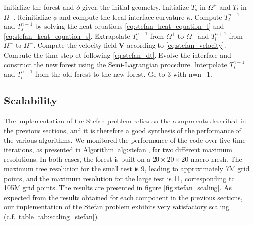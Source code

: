 \begin{algorithm}[htbp]
\caption{$\texttt{General procedure for solving the Stefan problem}$}
\begin{algorithmic}[1]
\State Initialize the forest and $\phi$ given the initial geometry.
\State Initialize $T_s$ in $\Omega^+$ and $T_l$ in $\Omega^-$.
\State Reinitialize $\phi$ and compute the local interface curvature $\kappa$.
\State Compute $T^{n+1}_l$ and $T^{n+1}_s$ by solving the heat equations \eqref{eq:stefan_heat_equation_l} and \eqref{eq:stefan_heat_equation_s}.
\State Extrapolate $T^{n+1}_s$ from $\Omega^+$ to $\Omega^-$ and $T^{n+1}_l$ from $\Omega^-$ to $\Omega^+$.
\State Compute the velocity field $\underline{\mathbf{V}}$ according to \eqref{eq:stefan_velocity}.
\State Compute the time step dt following \eqref{eq:stefan_dt}.
\State Evolve the interface and construct the new forest using the Semi-Lagrangian procedure.
\State Interpolate $T^{n+1}_s$ and $T^{n+1}_l$ from the old forest to the new forest.
\State Go to 3 with n=n+1.
\end{algorithmic}
\label{alg:stefan}
\end{algorithm}

\subsection{Scalability}

The implementation of the Stefan problem relies on the components described in the previous sections, and it is therefore a good synthesis of the performance of the various algorithms. We monitored the performance of the code over five time iterations, as presented in Algorithm \ref{alg:stefan}, for two different maximum resolutions. In both cases, the forest is built on a $20\times20\times20$ macro-mesh. The maximum tree resolution for the small test is 9, leading to approximately 7M grid points, and the maximum resolution for the large test is 11, corresponding to 105M grid points. The results are presented in figure \ref{fig:stefan_scaling}. As expected from the results obtained for each component in the previous sections, our implementation of the Stefan problem exhibits very satisfactory scaling (c.f.\ table \ref{tab:scaling_stefan}).

